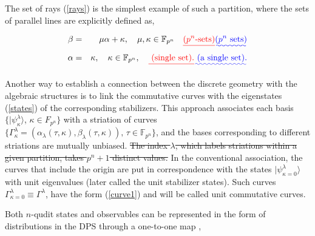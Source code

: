 \documentclass[quantumrep,article,submit,pdftex,moreauthors]{Definitions/mdpi}
\providecommand{\DIFadd}[1]{{\protect\color{blue}\uwave{#1}}} %
\providecommand{\DIFdel}[1]{{\protect\color{red}\sout{#1}}}                      %
\providecommand{\DIFaddbegin}{} %
\providecommand{\DIFaddend}{} %
\providecommand{\DIFdelbegin}{} %
\providecommand{\DIFdelend}{} %
\begin{document}
\DIFaddend The set of rays (\ref{rays}) is the simplest example of such a partition, where
the sets of parallel lines are explicitly defined as,

\begin{eqnarray}
  \beta
  &=& \mu \alpha + \kappa, \quad \mu, \kappa \in \mathbb{F}_{p^{n}}
  \quad \DIFdelbegin \DIFdel{\text{($p^{n}$-sets)}
  }\DIFdelend \DIFaddbegin \DIFadd{\text{($p^{n}$ sets)}
  }\DIFaddend \label{rays0} \\
  \alpha
  &=& \kappa, \quad \kappa \in \mathbb{F}_{p^{n}},
  \quad \DIFdelbegin \DIFdel{\text{ (single set).} 
  }\DIFdelend \DIFaddbegin \DIFadd{\text{ (a single set).}
  }\DIFaddend \notag
\end{eqnarray}

Another way to establish a connection between the discrete geometry with the
algebraic structures is to link the commutative curves with the eigenstates
(\ref{states}) of the corresponding stabilizers. This approach associates each
basis \DIFdelbegin \DIFdel{$\{|\psi_{\kappa}^{\lambda}\rangle$}\DIFdelend \DIFaddbegin \DIFadd{$\{|\psi _{\kappa }^{\lambda }\rangle $}\DIFaddend , $\kappa \in F_{p^{n}}\}$ with a
striation of curves \DIFdelbegin \DIFdel{$\{\Gamma_{\kappa }^{\lambda } = \left(\alpha_{\lambda
}(\tau,\kappa ),\beta_{\lambda }(\tau,\kappa )\right), \, \tau \in
\mathbb{F}_{p^n}\}$}\DIFdelend \DIFaddbegin \DIFadd{$\{\Gamma_{\kappa }^{\lambda } = \left( \alpha_{\lambda
}(\tau ,\kappa ),\beta_{\lambda }(\tau ,\kappa )\right) ,\,\tau \in
\mathbb{F}_{p^{n}}\}$}\DIFaddend , and the bases corresponding to different striations are
mutually unbiased. \DIFdelbegin \DIFdel{The index
$\lambda$, which labels striations within a given partition, takes $p^{n}+1$
distinct values. }\DIFdelend In the conventional association, the curves that include the
origin are put in correspondence with the states \DIFdelbegin \DIFdel{$|\psi_{\kappa=0}^{\lambda}\rangle$ }\DIFdelend \DIFaddbegin \DIFadd{$|\psi_{\kappa = 0}^{\lambda
}\rangle $ }\DIFaddend with unit eigenvalues (later called the unit stabilizer states). Such
curves \DIFdelbegin \DIFdel{$\Gamma_{\kappa=0}^{\lambda} \equiv
\Gamma^{\lambda}$}\DIFdelend \DIFaddbegin \DIFadd{$\Gamma_{\kappa =0}^{\lambda }\equiv \Gamma^{\lambda }$}\DIFaddend , have the form
(\ref{curve1}) and will be called unit commutative curves. 

Both $n$-qudit states and observables can be represented in the form of
distributions in the DPS through a one-to-one map
\cite{gross,DFW2-1,DFW2-2,DFW2-3,DFW2-4},
\end{document}
